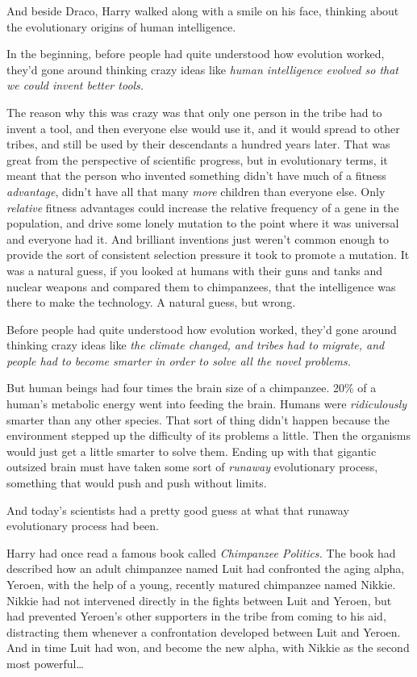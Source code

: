 And beside Draco, Harry walked along with a smile on his face, thinking
about the evolutionary origins of human intelligence.

In the beginning, before people had quite understood how evolution
worked, they'd gone around thinking crazy ideas like \emph{human
intelligence evolved so that we could invent better tools.}

The reason why this was crazy was that only one person in the tribe had
to invent a tool, and then everyone else would use it, and it would
spread to other tribes, and still be used by their descendants a hundred
years later. That was great from the perspective of scientific progress,
but in evolutionary terms, it meant that the person who invented
something didn't have much of a fitness \emph{advantage}, didn't have
all that many \emph{more} children than everyone else. Only
\emph{relative} fitness advantages could increase the relative frequency
of a gene in the population, and drive some lonely mutation to the point
where it was universal and everyone had it. And brilliant inventions
just weren't common enough to provide the sort of consistent selection
pressure it took to promote a mutation. It was a natural guess, if you
looked at humans with their guns and tanks and nuclear weapons and
compared them to chimpanzees, that the intelligence was there to make
the technology. A natural guess, but wrong.

Before people had quite understood how evolution worked, they'd gone
around thinking crazy ideas like \emph{the climate changed, and tribes
had to migrate, and people had to become smarter in order to solve all
the novel problems.}

But human beings had four times the brain size of a chimpanzee. 20\% of
a human's metabolic energy went into feeding the brain. Humans were
\emph{ridiculously} smarter than any other species. That sort of thing
didn't happen because the environment stepped up the difficulty of its
problems a little. Then the organisms would just get a little smarter to
solve them. Ending up with that gigantic outsized brain must have taken
some sort of \emph{runaway} evolutionary process, something that would
push and push without limits.

And today's scientists had a pretty good guess at what that runaway
evolutionary process had been.

Harry had once read a famous book called \emph{Chimpanzee Politics.} The
book had described how an adult chimpanzee named Luit had confronted the
aging alpha, Yeroen, with the help of a young, recently matured
chimpanzee named Nikkie. Nikkie had not intervened directly in the
fights between Luit and Yeroen, but had prevented Yeroen's other
supporters in the tribe from coming to his aid, distracting them
whenever a confrontation developed between Luit and Yeroen. And in time
Luit had won, and become the new alpha, with Nikkie as the second most
powerful\ldots{}

